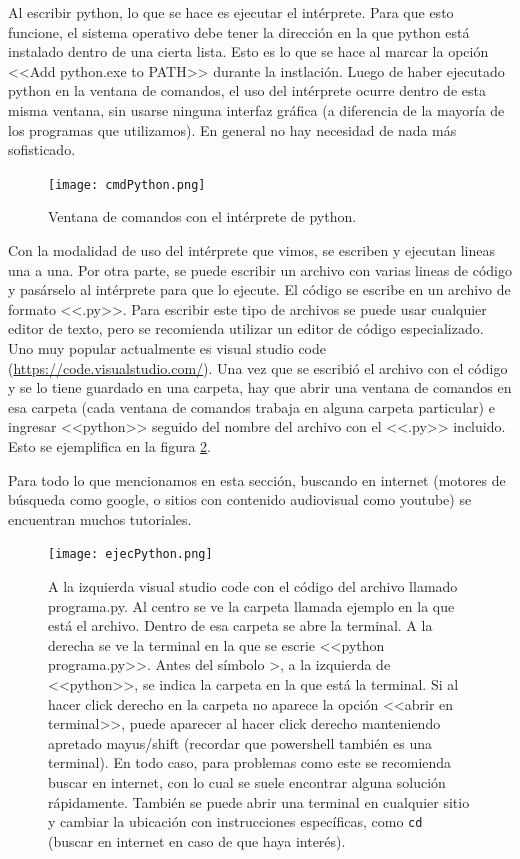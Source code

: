 \documentclass[a4paper, 12pt]{report}
\theoremstyle{definition}
\begin{document}
Al escribir python, lo que se hace es ejecutar el intérprete. Para que esto funcione, el sistema operativo debe tener la dirección en la que python está instalado dentro de una cierta lista. Esto es lo que se hace al marcar la opción <<Add python.exe to PATH>> durante la instlación. Luego de haber ejecutado python en la ventana de comandos, el uso del intérprete ocurre dentro de esta misma ventana, sin usarse ninguna interfaz gráfica (a diferencia de la mayoría de los programas que utilizamos). En general no hay necesidad de nada más sofisticado.

\begin{figure}
	\centering
	\texttt{[image: cmdPython.png]}
	\caption{Ventana de comandos con el intérprete de python.}
	\label{fig-cmdPython}
\end{figure}

Con la modalidad de uso del intérprete que vimos, se escriben y ejecutan lineas una a una. Por otra parte, se puede escribir un archivo con varias lineas de código y pasárselo al intérprete para que lo ejecute. El código se escribe en un archivo de formato <<.py>>. Para escribir este tipo de archivos se puede usar cualquier editor de texto, pero se recomienda utilizar un editor de código especializado. Uno muy popular actualmente es visual studio code (\href{https://code.visualstudio.com/}{https://code.visualstudio.com/}). Una vez que se escribió el archivo con el código y se lo tiene guardado en una carpeta, hay que abrir una ventana de comandos en esa carpeta (cada ventana de comandos trabaja en alguna carpeta particular) e ingresar <<python>> seguido del nombre del archivo con el <<.py>> incluido. Esto se ejemplifica en la figura \ref{fig-ejecPython}.

Para todo lo que mencionamos en esta sección, buscando en internet (motores de búsqueda como google, o sitios con contenido audiovisual como youtube) se encuentran muchos tutoriales. 

\begin{figure}
	\centering
	\texttt{[image: ejecPython.png]}
	\caption{A la izquierda visual studio code con el código del archivo llamado programa.py. Al centro se ve la carpeta llamada ejemplo en la que está el archivo. Dentro de esa carpeta se abre la terminal. A la derecha se ve la terminal en la que se escrie <<python programa.py>>. Antes del símbolo >, a la izquierda de <<python>>, se indica la carpeta en la que está la terminal. Si al hacer click derecho en la carpeta no aparece la opción <<abrir en terminal>>, puede aparecer al hacer click derecho manteniendo apretado mayus/shift (recordar que powershell también es una terminal). En todo caso, para problemas como este se recomienda buscar en internet, con lo cual se suele encontrar alguna solución rápidamente. También se puede abrir una terminal en cualquier sitio y cambiar la ubicación con instrucciones específicas, como {\tt cd} (buscar en internet en caso de que haya interés).}
	\label{fig-ejecPython}
\end{figure}
\end{document}
